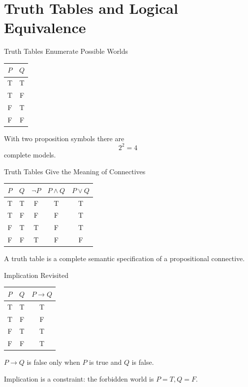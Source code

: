 \documentclass[aspectratio=169,10pt]{beamer}
\begin{document}
\section{Truth Tables and Logical Equivalence}

\begin{frame}[shrink=12]{Truth Tables Enumerate Possible Worlds}
  \begin{center}
    \renewcommand{\arraystretch}{1.35}
    \begin{tabular}{c|c}
      \textbf{$P$} & \textbf{$Q$} \\\hline
      T & T \\
      T & F \\
      F & T \\
      F & F
    \end{tabular}
  \end{center}

  With two proposition symbols there are
  \[
    2^2=4
  \]
  complete models.
\end{frame}

\begin{frame}[shrink=12]{Truth Tables Give the Meaning of Connectives}
  \begin{center}
    \renewcommand{\arraystretch}{1.25}
    \begin{tabular}{c|c|c|c|c}
      $P$ & $Q$ & $\neg P$ & $P\land Q$ & $P\lor Q$ \\\hline
      T & T & F & T & T \\
      T & F & F & F & T \\
      F & T & T & F & T \\
      F & F & T & F & F
    \end{tabular}
  \end{center}

  \begin{keyidea}
    A truth table is a complete semantic specification of a propositional connective.
  \end{keyidea}
\end{frame}

\begin{frame}[shrink=12]{Implication Revisited}
  \begin{center}
    \renewcommand{\arraystretch}{1.30}
    \begin{tabular}{c|c|c}
      $P$ & $Q$ & $P\rightarrow Q$ \\\hline
      T & T & T \\
      T & F & F \\
      F & T & T \\
      F & F & T
    \end{tabular}
  \end{center}

  $P\rightarrow Q$ is false only when $P$ is true and $Q$ is false.

  \begin{keyidea}
    Implication is a constraint: the forbidden world is $P=T, Q=F$.
  \end{keyidea}
\end{frame}
\end{document}
